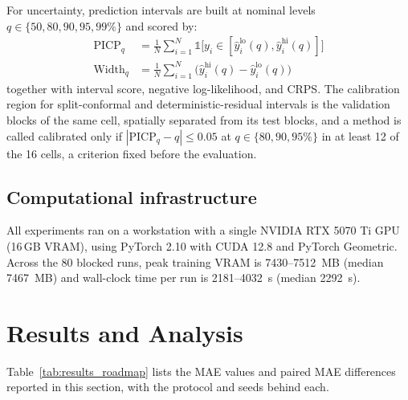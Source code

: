 \documentclass{ieeeaccess}
\begin{document}
For uncertainty, prediction intervals are built at nominal levels $q \in \{50, 80, 90, 95, 99\%\}$ and scored by:
\begin{align}
\text{PICP}_q &= \frac{1}{N}\sum_{i=1}^{N} \mathbb{1}\!\bigl[y_i \in [\hat{y}_i^{\text{lo}}(q), \hat{y}_i^{\text{hi}}(q)]\bigr] \label{eq:picp} \\
\text{Width}_q &= \frac{1}{N}\sum_{i=1}^{N} \bigl(\hat{y}_i^{\text{hi}}(q) - \hat{y}_i^{\text{lo}}(q)\bigr) \label{eq:sharpness}
\end{align}
together with interval score, negative log-likelihood, and CRPS. The calibration region for split-conformal and deterministic-residual intervals is the validation blocks of the same cell, spatially separated from its test blocks, and a method is called calibrated only if $|\text{PICP}_q - q| \le 0.05$ at $q \in \{80, 90, 95\%\}$ in at least 12 of the 16 cells, a criterion fixed before the evaluation.

\subsection{Computational infrastructure}

All experiments ran on a workstation with a single NVIDIA RTX 5070 Ti GPU (16\,GB VRAM), using PyTorch 2.10 with CUDA 12.8 and PyTorch Geometric. Across the 80 blocked runs, peak training VRAM is 7430--7512~MB (median 7467~MB) and wall-clock time per run is 2181--4032~s (median 2292~s).


\section{Results and Analysis}
\label{sec:results}

Table~\ref{tab:results_roadmap} lists the MAE values and paired MAE differences reported in this section, with the protocol and seeds behind each.
\end{document}
